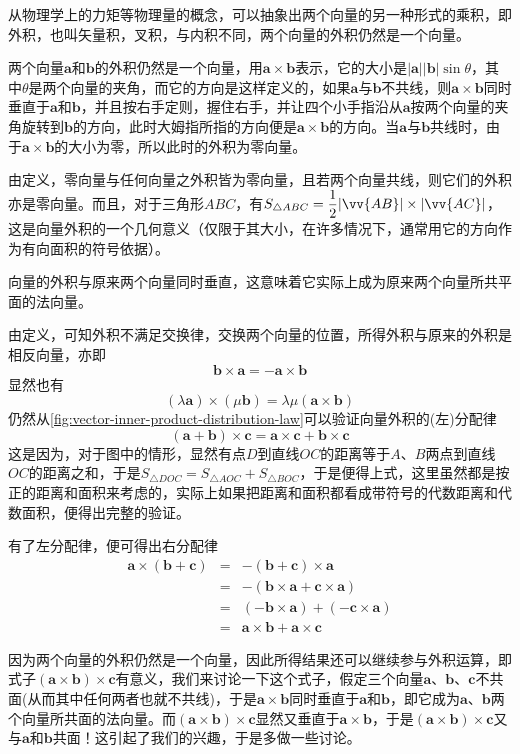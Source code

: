 从物理学上的力矩等物理量的概念，可以抽象出两个向量的另一种形式的乘积，即外积，也叫矢量积，叉积，与内积不同，两个向量的外积仍然是一个向量。

\begin{definition}
  两个向量$\bm{a}$和$\bm{b}$的外积仍然是一个向量，用$\bm{a}\times\bm{b}$表示，它的大小是$|\bm{a}||\bm{b}|\sin{\theta}$，其中$\theta$是两个向量的夹角，而它的方向是这样定义的，如果$\bm{a}$与$\bm{b}$不共线，则$\bm{a}\times\bm{b}$同时垂直于$\bm{a}$和$\bm{b}$，并且按右手定则，握住右手，并让四个小手指沿从$\bm{a}$按两个向量的夹角旋转到$\bm{b}$的方向，此时大姆指所指的方向便是$\bm{a}\times\bm{b}$的方向。当$\bm{a}$与$\bm{b}$共线时，由于$\bm{a}\times\bm{b}$的大小为零，所以此时的外积为零向量。
\end{definition}

由定义，零向量与任何向量之外积皆为零向量，且若两个向量共线，则它们的外积亦是零向量。而且，对于三角形$ABC$，有$S_{\triangle ABC} = \dfrac{1}{2}|\vv{AB}|\times|\vv{AC}|$，这是向量外积的一个几何意义（仅限于其大小，在许多情况下，通常用它的方向作为有向面积的符号依据）。

向量的外积与原来两个向量同时垂直，这意味着它实际上成为原来两个向量所共平面的法向量。

由定义，可知外积不满足交换律，交换两个向量的位置，所得外积与原来的外积是相反向量，亦即
\[ \bm{b} \times \bm{a} = - \bm{a} \times \bm{b} \]
显然也有
\[ (\lambda \bm{a}) \times (\mu \bm{b}) = \lambda \mu (\bm{a}\times\bm{b}) \]
仍然从\autoref{fig:vector-inner-product-distribution-law}可以验证向量外积的(左)分配律
\[ (\bm{a}+\bm{b}) \times \bm{c} = \bm{a} \times \bm{c} + \bm{b} \times \bm{c} \]
这是因为，对于图中的情形，显然有点$D$到直线$OC$的距离等于$A$、$B$两点到直线$OC$的距离之和，于是$S_{\triangle DOC} = S_{\triangle AOC} + S_{\triangle BOC}$，于是便得上式，这里虽然都是按正的距离和面积来考虑的，实际上如果把距离和面积都看成带符号的代数距离和代数面积，便得出完整的验证。

有了左分配律，便可得出右分配律
\begin{eqnarray*}
  \bm{a} \times (\bm{b} + \bm{c}) & = & - (\bm{b} + \bm{c}) \times \bm{a} \\
                                  & = & - (\bm{b} \times \bm{a} + \bm{c} \times \bm{a}) \\
                                  & = & (-\bm{b}\times\bm{a}) + (-\bm{c}\times\bm{a}) \\
  & = & \bm{a}\times\bm{b} + \bm{a}\times\bm{c}
\end{eqnarray*}

因为两个向量的外积仍然是一个向量，因此所得结果还可以继续参与外积运算，即式子$(\bm{a}\times\bm{b})\times\bm{c}$有意义，我们来讨论一下这个式子，假定三个向量$\bm{a}$、$\bm{b}$、$\bm{c}$不共面(从而其中任何两者也就不共线)，于是$\bm{a}\times\bm{b}$同时垂直于$\bm{a}$和$\bm{b}$，即它成为$\bm{a}$、$\bm{b}$两个向量所共面的法向量。而$(\bm{a}\times\bm{b})\times\bm{c}$显然又垂直于$\bm{a}\times\bm{b}$，于是$(\bm{a}\times\bm{b})\times\bm{c}$又与$\bm{a}$和$\bm{b}$共面！这引起了我们的兴趣，于是多做一些讨论。

